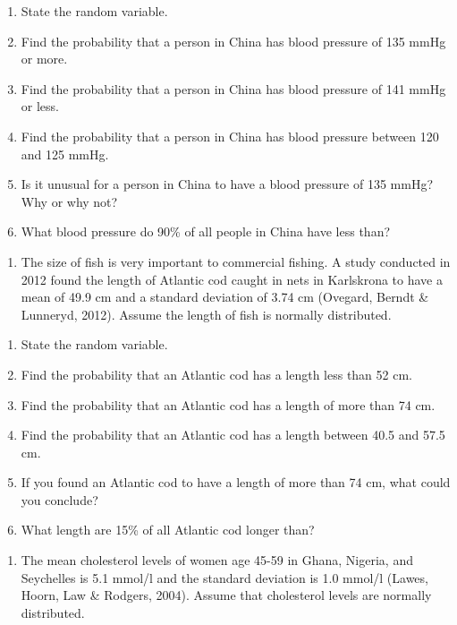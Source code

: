 \documentclass[]{book}
\providecommand{\tightlist}{%
  \setlength{\itemsep}{0pt}\setlength{\parskip}{0pt}}
\begin{document}
\begin{enumerate}
\def\labelenumi{\alph{enumi}.}
\item
  State the random variable.
\item
  Find the probability that a person in China has blood pressure of
  135 mmHg or more.
\item
  Find the probability that a person in China has blood pressure of
  141 mmHg or less.
\item
  Find the probability that a person in China has blood pressure
  between 120 and 125 mmHg.
\item
  Is it unusual for a person in China to have a blood pressure of 135
  mmHg? Why or why not?
\item
  What blood pressure do 90\% of all people in China have less than?
\end{enumerate}

\begin{enumerate}
\def\labelenumi{\arabic{enumi}.}
\setcounter{enumi}{4}
\tightlist
\item
  The size of fish is very important to commercial fishing. A study
  conducted in 2012 found the length of Atlantic cod caught in nets in
  Karlskrona to have a mean of 49.9 cm and a standard deviation of
  3.74 cm (Ovegard, Berndt \& Lunneryd, 2012). Assume the length of
  fish is normally distributed.
\end{enumerate}

\begin{enumerate}
\def\labelenumi{\alph{enumi}.}
\item
  State the random variable.
\item
  Find the probability that an Atlantic cod has a length less than
  52 cm.
\item
  Find the probability that an Atlantic cod has a length of more than
  74 cm.
\item
  Find the probability that an Atlantic cod has a length between 40.5
  and 57.5 cm.
\item
  If you found an Atlantic cod to have a length of more than 74 cm,
  what could you conclude?
\item
  What length are 15\% of all Atlantic cod longer than?
\end{enumerate}

\begin{enumerate}
\def\labelenumi{\arabic{enumi}.}
\setcounter{enumi}{5}
\tightlist
\item
  The mean cholesterol levels of women age 45-59 in Ghana, Nigeria,
  and Seychelles is 5.1 mmol/l and the standard deviation is 1.0
  mmol/l (Lawes, Hoorn, Law \& Rodgers, 2004). Assume that cholesterol
  levels are normally distributed.
\end{enumerate}
\end{document}
